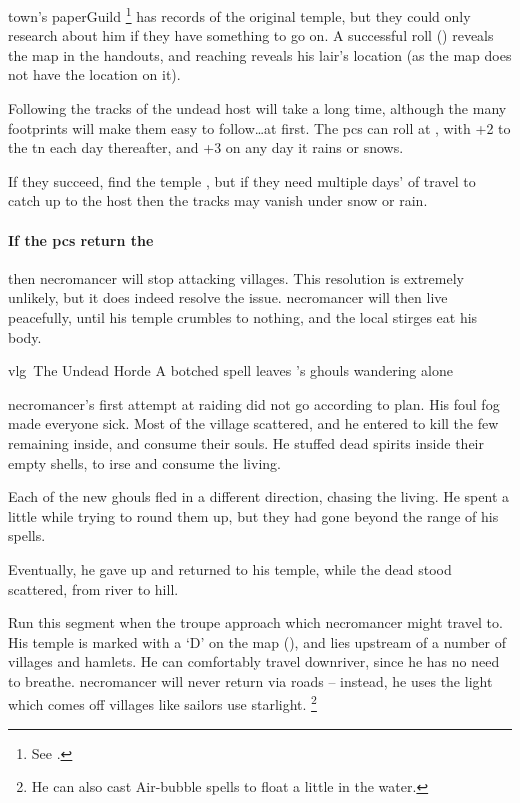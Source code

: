\Gls{town}'s \gls{paperGuild}%
\footnote{See .}
has records of the original temple, but they could only research about him if they have something to go on.
A successful  roll (\tn[12]) reveals the map in the handouts, and reaching \tn[14] reveals his lair's location (as the map does not have the location on it).

Following the tracks of the undead host will take a long time, although the many footprints will make them easy to follow\ldots at first.
The \glspl{pc} can roll  at \tn[5], with +2 to the \gls{tn} each day thereafter, and +3 on any day it rains or snows.

If they succeed, find the temple , but if they need multiple days' of travel to catch up to the host then the tracks may vanish under snow or rain.

\paragraph{If the \glspl{pc} return the }
then \gls{necromancer} will stop attacking \glspl{village}.
This resolution is extremely unlikely, but it does indeed resolve the issue.
\Gls{necromancer} will then live peacefully, until his temple crumbles to nothing, and the local stirges eat his body.

{\gls{vlg}~The Undead Horde}%
{A botched spell leaves 's ghouls wandering alone}%
\label{necroHorde}

\begin{exampletext}
  \Gls{necromancer}'s first attempt at raiding  did not go according to plan.
  His foul fog made everyone sick.
  Most of the \gls{village} scattered, and he entered to kill the few remaining inside, and consume their souls.
  He stuffed dead spirits inside their empty shells, to irse and consume the living.

  Each of the new ghouls fled in a different direction, chasing the living.
  He spent a little while trying to round them up, but they had gone beyond the range of his spells.

  Eventually, he gave up and returned to his temple, while the dead stood scattered, from river to hill.
\end{exampletext}

Run this \gls{segment} when the troupe approach  which \gls{necromancer} might travel to.
His temple is marked with a `\gls{D}' on the map (), and lies upstream of a number of \glspl{village} and hamlets.
He can comfortably travel downriver, since he has no need to breathe.
\Gls{necromancer} will never return via roads -- instead, he uses the light which comes off \glspl{village} like sailors use starlight.
\footnote{He can also cast Air-bubble spells to float a little in the water.}

